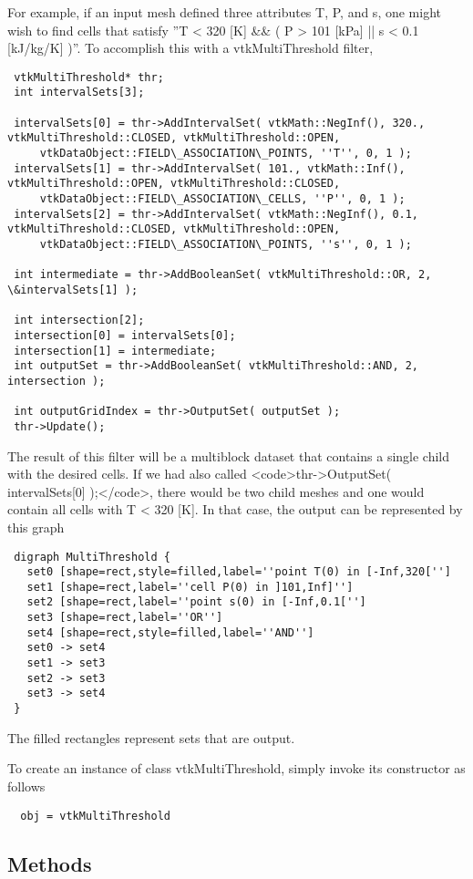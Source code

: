  For example, if an input mesh defined three attributes T, P, and s, one might
 wish to find cells that satisfy ''T < 320 [K] \&\& ( P > 101 [kPa] || s < 0.1 [kJ/kg/K] )''.
 To accomplish this with a vtkMultiThreshold filter,
 \begin{verbatim}
 vtkMultiThreshold* thr;
 int intervalSets[3];

 intervalSets[0] = thr->AddIntervalSet( vtkMath::NegInf(), 320., vtkMultiThreshold::CLOSED, vtkMultiThreshold::OPEN,
     vtkDataObject::FIELD\_ASSOCIATION\_POINTS, ''T'', 0, 1 );
 intervalSets[1] = thr->AddIntervalSet( 101., vtkMath::Inf(), vtkMultiThreshold::OPEN, vtkMultiThreshold::CLOSED,
     vtkDataObject::FIELD\_ASSOCIATION\_CELLS, ''P'', 0, 1 );
 intervalSets[2] = thr->AddIntervalSet( vtkMath::NegInf(), 0.1, vtkMultiThreshold::CLOSED, vtkMultiThreshold::OPEN,
     vtkDataObject::FIELD\_ASSOCIATION\_POINTS, ''s'', 0, 1 );

 int intermediate = thr->AddBooleanSet( vtkMultiThreshold::OR, 2, \&intervalSets[1] );

 int intersection[2];
 intersection[0] = intervalSets[0];
 intersection[1] = intermediate;
 int outputSet = thr->AddBooleanSet( vtkMultiThreshold::AND, 2, intersection );

 int outputGridIndex = thr->OutputSet( outputSet );
 thr->Update();
 \end{verbatim}
 The result of this filter will be a multiblock dataset that contains a single child with the desired cells.
 If we had also called <code>thr->OutputSet( intervalSets[0] );</code>, there would be two child meshes and
 one would contain all cells with T < 320 [K].
 In that case, the output can be represented by this graph
 \begin{verbatim}
 digraph MultiThreshold {
   set0 [shape=rect,style=filled,label=''point T(0) in [-Inf,320['']
   set1 [shape=rect,label=''cell P(0) in ]101,Inf]'']
   set2 [shape=rect,label=''point s(0) in [-Inf,0.1['']
   set3 [shape=rect,label=''OR'']
   set4 [shape=rect,style=filled,label=''AND'']
   set0 -> set4
   set1 -> set3
   set2 -> set3
   set3 -> set4
 }
 \end{verbatim}
 The filled rectangles represent sets that are output.

To create an instance of class vtkMultiThreshold, simply
invoke its constructor as follows
\begin{verbatim}
  obj = vtkMultiThreshold
\end{verbatim}
\subsection{Methods}

